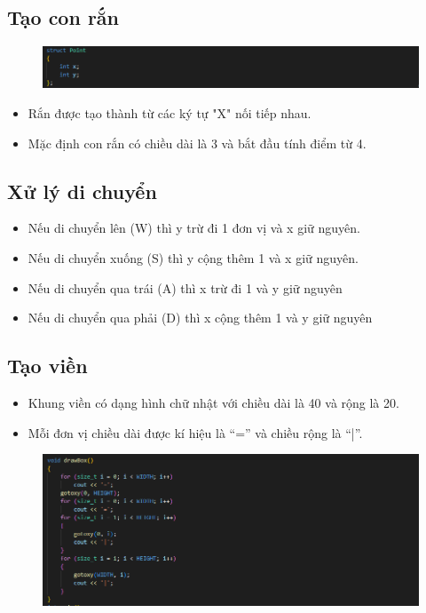 \documentclass[../main-report.tex]{subfiles}
\begin{document}
\subsection{Tạo con rắn}
\begin{figure}[ht]
    \centering
    \includegraphics[scale=0.6]{hinh/snake1.png}
\end{figure}
\begin{itemize}
    \item Rắn được tạo thành từ các ký tự "X" nối tiếp nhau.
    \item Mặc định con rắn có chiều dài là 3 và bắt đầu tính điểm từ 4.
\end{itemize}
\subsection{Xử lý di chuyển}
\begin{itemize}
    \item Nếu di chuyển lên (W) thì y trừ đi 1 đơn vị và x giữ nguyên.
    \item Nếu di chuyển xuống (S) thì y cộng thêm 1 và x giữ nguyên.
    \item Nếu di chuyển qua trái (A) thì x trừ đi 1 và y giữ nguyên
    \item Nếu di chuyển qua phải (D) thì x cộng thêm 1 và y giữ nguyên
\end{itemize}

\subsection{Tạo viền}
\begin{itemize}
    \item Khung viền có dạng hình chữ nhật với chiều dài là 40 và rộng là 20.
    \item Mỗi đơn vị chiều dài được kí hiệu là “=” và chiều rộng là “|”.
\end{itemize}
\begin{figure}[ht]
    \centering
    \includegraphics[scale=0.6]{chapters/hinh/snake6.png}
\end{figure}
\end{document}
